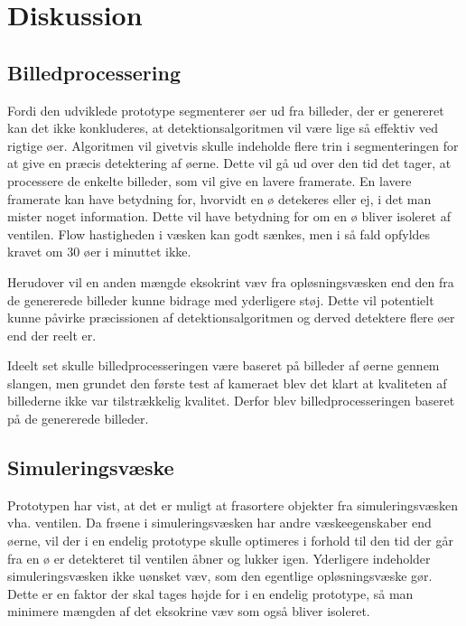 \chapter{Diskussion}

\section{Billedprocessering}
Fordi den udviklede prototype segmenterer øer ud fra billeder, der er genereret kan det ikke konkluderes, at detektionsalgoritmen vil være lige så effektiv ved rigtige øer. Algoritmen vil givetvis skulle indeholde flere trin i segmenteringen for at give en præcis detektering af øerne. Dette vil gå ud over den tid det tager, at processere de enkelte billeder, som vil give en lavere framerate. En lavere framerate kan have betydning for, hvorvidt en ø detekeres eller ej, i det man mister noget information. Dette vil have betydning for om en ø bliver isoleret af ventilen. Flow hastigheden i væsken kan godt sænkes, men i så fald opfyldes kravet om 30 øer i minuttet ikke.

Herudover vil en anden mængde eksokrint væv fra opløsningsvæsken end den fra de genererede billeder kunne bidrage med yderligere støj. Dette vil potentielt kunne påvirke præcissionen af detektionsalgoritmen og derved detektere flere øer end der reelt er. 

Ideelt set skulle billedprocesseringen være baseret på billeder af øerne gennem slangen, men grundet den første test af kameraet blev det klart at kvaliteten af billederne ikke var tilstrækkelig kvalitet. Derfor blev billedprocesseringen baseret på de genererede billeder. 

\section{Simuleringsvæske}
Prototypen har vist, at det er muligt at frasortere objekter fra simuleringsvæsken vha. ventilen. Da frøene i simuleringsvæsken har andre væskeegenskaber end øerne, vil der i en endelig prototype skulle optimeres i forhold til den tid der går fra en ø er detekteret til ventilen åbner og lukker igen. Yderligere indeholder simuleringsvæsken ikke uønsket væv, som den egentlige opløsningsvæske gør. Dette er en faktor der skal tages højde for i en endelig prototype, så man minimere mængden af det eksokrine væv som også bliver isoleret.


